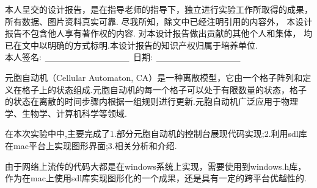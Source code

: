 


\newpage
\thispagestyle{empty}
\vspace*{20pt}
\begin{center}{}\end{center}
\par\vspace*{30pt}
\renewcommand{\baselinestretch}{2}

{%

本人呈交的设计报告，是在指导老师的指导下，独立进行实验工作所取得的成果，
所有数据、图片资料真实可靠. 尽我所知，除文中已经注明引用的内容外，
本设计报告不包含他人享有著作权的内容.
对本设计报告做出贡献的其他个人和集体，
均已在文中以明确的方式标明.本设计报告的知识产权归属于培养单位.\\[2cm]

\hspace*{1cm}本人签名: $\underline{\hspace{3.5cm}}$
\hspace{2cm}日期: $\underline{\hspace{3.5cm}}$\hfill\par}
\baselineskip=23pt  %





\begin{cnabstract}
\thispagestyle{empty}

元胞自动机（Cellular Automaton, CA）是一种离散模型，它由一个格子阵列和定义在格子上的状态组成.元胞自动机的每一个格子可以处于有限数量的状态，格子的状态在离散的时间步骤内根据一组规则进行更新.元胞自动机广泛应用于物理学、生物学、计算机科学等领域.

在本次实验中中,主要完成了1.部分元胞自动机的控制台展现代码实现;2.利用sdl库在mac平台上实现图形界面;3.相关分析和介绍.

由于网络上流传的代码大都是在windows系统上实现，需要使用到windows.h库，作为在mac上使用sdl库实现图形化的一个成果，还是具有一定的跨平台优越性的.
\end{cnabstract}
\par
\vspace*{2em}

